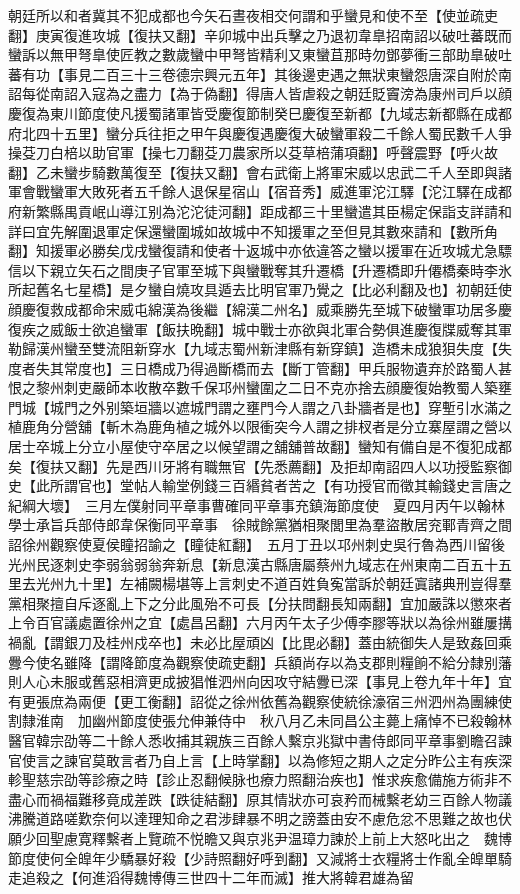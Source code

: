 朝廷所以和者冀其不犯成都也今矢石晝夜相交何謂和乎蠻見和使不至【使並疏吏翻】庚寅復進攻城【復扶又翻】辛卯城中出兵擊之乃退初韋臯招南詔以破吐蕃既而蠻訴以無甲弩臯使匠教之數歲蠻中甲弩皆精利又東蠻苴那時勿鄧夢衝三部助臯破吐蕃有功【事見二百三十三卷德宗興元五年】其後邊吏遇之無狀東蠻怨唐深自附於南詔每從南詔入寇為之盡力【為于偽翻】得唐人皆虐殺之朝廷貶竇滂為康州司戶以顔慶復為東川節度使凡援蜀諸軍皆受慶復節制癸巳慶復至新都【九域志新都縣在成都府北四十五里】蠻分兵往拒之甲午與慶復遇慶復大破蠻軍殺二千餘人蜀民數千人爭操芟刀白棓以助官軍【操七刀翻芟刀農家所以芟草棓蒲項翻】呼聲震野【呼火故翻】乙未蠻步騎數萬復至【復扶又翻】會右武衛上將軍宋威以忠武二千人至即與諸軍會戰蠻軍大敗死者五千餘人退保星宿山【宿音秀】威進軍沱江驛【沱江驛在成都府新繁縣禺貢岷山導江别為沱沱徒河翻】距成都三十里蠻遣其臣楊定保詣支詳請和詳曰宜先解圍退軍定保還蠻圍城如故城中不知援軍之至但見其數來請和【數所角翻】知援軍必勝矣戊戌蠻復請和使者十返城中亦依違答之蠻以援軍在近攻城尤急驃信以下親立矢石之間庚子官軍至城下與蠻戰奪其升遷橋【升遷橋即升僊橋秦時李氷所起舊名七星橋】是夕蠻自燒攻具遁去比明官軍乃覺之【比必利翻及也】初朝廷使顔慶復救成都命宋威屯綿漢為後繼【綿漢二州名】威乘勝先至城下破蠻軍功居多慶復疾之威飯士欲追蠻軍【飯扶晩翻】城中戰士亦欲與北軍合勢俱進慶復牒威奪其軍勒歸漢州蠻至雙流阻新穿水【九域志蜀州新津縣有新穿鎮】造橋未成狼狽失度【失度者失其常度也】三日橋成乃得過斷橋而去【斷丁管翻】甲兵服物遺弃於路蜀人甚恨之黎州刺吏嚴師本收散卒數千保邛州蠻圍之二日不克亦捨去顔慶復始教蜀人築壅門城【城門之外别築垣牆以遮城門謂之壅門今人謂之八卦牆者是也】穿塹引水滿之植鹿角分營舖【斬木為鹿角植之城外以限衝突今人謂之排杈者是分立寨屋謂之營以居士卒城上分立小屋使守卒居之以候望謂之舖舖普故翻】蠻知有備自是不復犯成都矣【復扶又翻】先是西川牙將有職無官【先悉薦翻】及拒却南詔四人以功授監察御史【此所謂官也】堂帖人輸堂例錢三百緡貧者苦之【有功授官而徵其輸錢史言唐之紀綱大壞】　三月左僕射同平章事曹確同平章事充鎮海節度使　夏四月丙午以翰林學士承旨兵部侍郎韋保衡同平章事　徐賊餘黨猶相聚閭里為羣盜散居兖鄆青齊之間詔徐州觀察使夏侯瞳招諭之【瞳徒紅翻】　五月丁丑以邛州刺史吳行魯為西川留後　光州民逐刺史李弱翁弱翁奔新息【新息漢古縣唐屬蔡州九域志在州東南二百五十五里去光州九十里】左補闕楊堪等上言刺史不道百姓負寃當訴於朝廷寘諸典刑豈得羣黨相聚擅自斥逐亂上下之分此風殆不可長【分扶問翻長知兩翻】宜加嚴誅以懲來者　上令百官議處置徐州之宜【處昌呂翻】六月丙午太子少傅李膠等狀以為徐州雖屢搆禍亂【謂銀刀及桂州戍卒也】未必比屋頑凶【比毘必翻】蓋由統御失人是致姦回乘釁今使名雖降【謂降節度為觀察使疏吏翻】兵額尚存以為支郡則糧餉不給分隸别藩則人心未服或舊惡相濟更成披猖惟泗州向因攻守結釁已深【事見上卷九年十年】宜有更張庶為兩便【更工衡翻】詔從之徐州依舊為觀察使統徐濠宿三州泗州為團練使割隸淮南　加幽州節度使張允伸兼侍中　秋八月乙未同昌公主薨上痛悼不已殺翰林醫官韓宗劭等二十餘人悉收捕其親族三百餘人繫京兆獄中書侍郎同平章事劉瞻召諫官使言之諫官莫敢言者乃自上言【上時掌翻】以為修短之期人之定分昨公主有疾深軫聖慈宗劭等診療之時【診止忍翻候脉也療力照翻治疾也】惟求疾愈備施方術非不盡心而禍福難移竟成差跌【跌徒結翻】原其情狀亦可哀矜而械繫老幼三百餘人物議沸騰道路嗟歎奈何以達理知命之君涉肆暴不明之謗蓋由安不慮危忿不思難之故也伏願少回聖慮寛釋繫者上覽疏不悦瞻又與京兆尹温璋力諫於上前上大怒叱出之　魏博節度使何全皥年少驕暴好殺【少詩照翻好呼到翻】又減將士衣糧將士作亂全皥單騎走追殺之【何進滔得魏博傳三世四十二年而滅】推大將韓君雄為留
